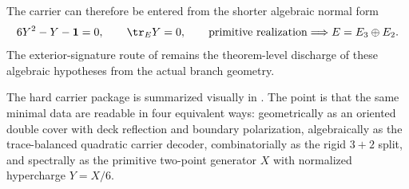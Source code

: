 \begin{remark}
The carrier can therefore be entered from the shorter algebraic normal form
\[
6Y^2-Y-\mathbf 1=0,
\qquad
\tr_EY=0,
\qquad
\text{primitive realization}
\Longrightarrow
E=E_3\oplus E_2.
\]
The exterior-signature route of  remains the theorem-level discharge
of these algebraic hypotheses from the actual branch geometry.
\end{remark}

The hard carrier package is summarized visually in . The point is
that the same minimal data are readable in four equivalent ways: geometrically as an oriented
double cover with deck reflection and boundary polarization, algebraically as the trace-balanced
quadratic carrier decoder, combinatorially as the rigid $3+2$ split, and spectrally as the
primitive two-point generator $X$ with normalized hypercharge $Y=X/6$.

